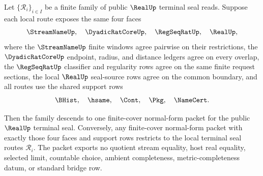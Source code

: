 \begin{theorem}
\label{thm:real-terminal-seal-four-face-cover-normal-form}
Let $\{\mathcal R_i\}_{i\in I}$ be a finite family of public $\RealUp$
terminal seal reads. Suppose each local route exposes the same four faces
$$
\StreamNameUp,\quad \DyadicRatCoreUp,\quad \RegSeqRatUp,\quad \RealUp,
$$
where the $\StreamNameUp$ finite windows agree pairwise on their restrictions,
the $\DyadicRatCoreUp$ endpoint, radius, and distance ledgers agree on every
overlap, the $\RegSeqRatUp$ classifier and regularity rows agree on the same
finite request sections, the local $\RealUp$ seal-source rows agree on the
common boundary, and all routes use the shared support rows
$$
\BHist,\quad \hsame,\quad \Cont,\quad \Pkg,\quad \NameCert.
$$

Then the family descends to one finite-cover normal-form packet for the public
$\RealUp$ terminal seal. Conversely, any finite-cover normal-form packet with
exactly those four faces and support rows restricts to the local terminal seal
routes $\mathcal R_i$. The packet exports no quotient stream equality, host
real equality, selected limit, countable choice, ambient completeness,
metric-completeness datum, or standard bridge row.
\end{theorem}
